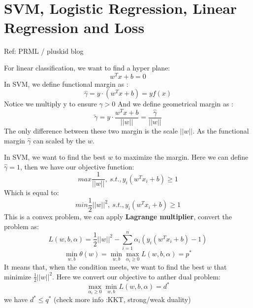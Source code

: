 \documentclass{article}
\begin{document}
\section{SVM, Logistic Regression, Linear Regression  and Loss}
Ref: PRML / pluskid blog

For linear classification, we want to find a hyper plane:
$$w^{T}x+b=0$$
In SVM, we define functional margin as :
$$\widehat{\gamma}=y \cdot (w^{T}x+b) = yf(x) $$
Notice we multiply y to ensure $\widehat{\gamma} >0$
And we define geometrical margin as :
$$\widetilde{\gamma}= y \cdot \frac{w^{T}x+b}{||w||} = \frac{\widehat{\gamma}}{||w||} $$
The only difference between these two margin is the scale $||w||$. As the functional margin $\widehat{\gamma}$ can scaled by the $w$. 

In SVM, we want to find the best $w$ to maximize the margin. Here we can define $\widehat{\gamma}=1$, then we have our objective function:
$$max \frac{1}{||w||},\ s.t.,y_{i}(w^{T}x_{i}+b) \ge 1 $$
Which is equal to: 
$$min \frac{1}{2}||w||^{2},\ s.t.,y_{i}(w^{T}x_{i}+b) \ge 1 $$
This is a convex problem, we can apply \textbf{Lagrange multiplier}, convert the problem as:
$$L(w,b,\alpha)=\frac{1}{2}||w||^{2}-\sum_{i=1}^{n}\alpha_{i}(y_{i}(w^{T}x_{i}+b)-1)$$
$$\min \limits_{w,b}\theta(w)=\min \limits_{w,b} \max \limits_{\alpha_{i} \ge 0} L(w,b,\alpha)=p^{*} $$
It means that, when the condition meets, we want to find the best $w$ that minimize $\frac{1}{2}||w||^{2}$. 
Here we convert our objective to anther dual problem:
$$\max \limits_{\alpha_{i} \ge 0} \min \limits_{w,b}  L(w,b,\alpha) =d^{*} $$
we have $d^{*} \leq q^{*}$ (check more info :KKT, strong/weak duality)




\end{document}
